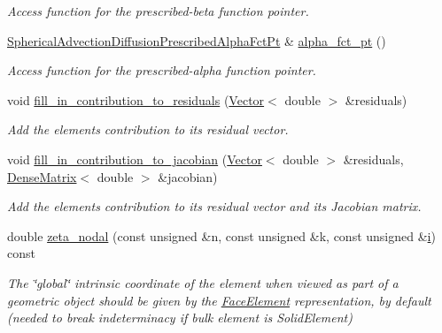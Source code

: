 \begin{DoxyCompactItemize}
\begin{DoxyCompactList}\small\item\em Access function for the prescribed-\/beta function pointer. \end{DoxyCompactList}\item 
\hyperlink{classoomph_1_1SphericalAdvectionDiffusionFluxElement_aabc503a4eeac639334283e7297b88423}{Spherical\+Advection\+Diffusion\+Prescribed\+Alpha\+Fct\+Pt} \& \hyperlink{classoomph_1_1SphericalAdvectionDiffusionFluxElement_ab84762e928d94711e2f77339c3f9ee49}{alpha\+\_\+fct\+\_\+pt} ()
\begin{DoxyCompactList}\small\item\em Access function for the prescribed-\/alpha function pointer. \end{DoxyCompactList}\item 
void \hyperlink{classoomph_1_1SphericalAdvectionDiffusionFluxElement_ac8579ca5c2ad606199559db1f971d13b}{fill\+\_\+in\+\_\+contribution\+\_\+to\+\_\+residuals} (\hyperlink{classoomph_1_1Vector}{Vector}$<$ double $>$ \&residuals)
\begin{DoxyCompactList}\small\item\em Add the element\textquotesingle{}s contribution to its residual vector. \end{DoxyCompactList}\item 
void \hyperlink{classoomph_1_1SphericalAdvectionDiffusionFluxElement_a3863a02374ac70bacd47face3285d469}{fill\+\_\+in\+\_\+contribution\+\_\+to\+\_\+jacobian} (\hyperlink{classoomph_1_1Vector}{Vector}$<$ double $>$ \&residuals, \hyperlink{classoomph_1_1DenseMatrix}{Dense\+Matrix}$<$ double $>$ \&jacobian)
\begin{DoxyCompactList}\small\item\em Add the element\textquotesingle{}s contribution to its residual vector and its Jacobian matrix. \end{DoxyCompactList}\item 
double \hyperlink{classoomph_1_1SphericalAdvectionDiffusionFluxElement_ab7dc1526807ada4b9189526b69653c91}{zeta\+\_\+nodal} (const unsigned \&n, const unsigned \&k, const unsigned \&\hyperlink{cfortran_8h_adb50e893b86b3e55e751a42eab3cba82}{i}) const
\begin{DoxyCompactList}\small\item\em The \char`\"{}global\char`\"{} intrinsic coordinate of the element when viewed as part of a geometric object should be given by the \hyperlink{classoomph_1_1FaceElement}{Face\+Element} representation, by default (needed to break indeterminacy if bulk element is Solid\+Element) \end{DoxyCompactList}\item 

\end{DoxyCompactItemize}

